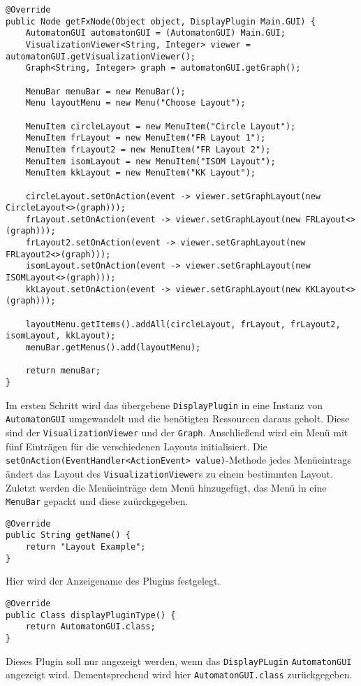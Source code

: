 \begin{lstlisting}[frame=single, basicstyle=\small, caption=Die Methode \textit{getFxNode}]
@Override
public Node getFxNode(Object object, DisplayPlugin Main.GUI) {
	AutomatonGUI automatonGUI = (AutomatonGUI) Main.GUI;
	VisualizationViewer<String, Integer> viewer = automatonGUI.getVisualizationViewer();
	Graph<String, Integer> graph = automatonGUI.getGraph();
	
	MenuBar menuBar = new MenuBar();
	Menu layoutMenu = new Menu("Choose Layout");
	
	MenuItem circleLayout = new MenuItem("Circle Layout");
	MenuItem frLayout = new MenuItem("FR Layout 1");
	MenuItem frLayout2 = new MenuItem("FR Layout 2");
	MenuItem isomLayout = new MenuItem("ISOM Layout");
	MenuItem kkLayout = new MenuItem("KK Layout");
	
	circleLayout.setOnAction(event -> viewer.setGraphLayout(new CircleLayout<>(graph)));
	frLayout.setOnAction(event -> viewer.setGraphLayout(new FRLayout<>(graph)));
	frLayout2.setOnAction(event -> viewer.setGraphLayout(new FRLayout2<>(graph)));
	isomLayout.setOnAction(event -> viewer.setGraphLayout(new ISOMLayout<>(graph)));
	kkLayout.setOnAction(event -> viewer.setGraphLayout(new KKLayout<>(graph)));
	
	layoutMenu.getItems().addAll(circleLayout, frLayout, frLayout2, isomLayout, kkLayout);
	menuBar.getMenus().add(layoutMenu);
	
	return menuBar;
}
\end{lstlisting}
Im ersten Schritt wird das übergebene \lstinline[columns=fixed]{DisplayPlugin} in eine Instanz von \lstinline[columns=fixed]{AutomatonGUI} umgewandelt und die benötigten Ressourcen daraus geholt. Diese sind der \lstinline[columns=fixed]{VisualizationViewer} und der \lstinline[columns=fixed]{Graph}. Anschließend wird ein Menü mit fünf Einträgen für die verschiedenen Layouts initialisiert. Die \lstinline[columns=fixed]{setOnAction(EventHandler<ActionEvent> value)}-Methode jedes Menüeintrags ändert das Layout des \lstinline[columns=fixed]{VisualizationViewer}s zu einem bestimmten Layout. Zuletzt werden die Menüeinträge dem Menü hinzugefügt, das Menü in eine \lstinline[columns=fixed]{MenuBar} gepackt und diese zuürckgegeben.
\begin{lstlisting}[frame=single, basicstyle=\small, caption=Die Methode \textit{getName}]
@Override
public String getName() {
	return "Layout Example";
}
\end{lstlisting}
Hier wird der Anzeigename des Plugins festgelegt.
\begin{lstlisting}[frame=single, basicstyle=\small, caption=Die Methode \textit{displayPluginType}]
@Override
public Class displayPluginType() {
	return AutomatonGUI.class;
}
\end{lstlisting}
Dieses Plugin soll nur angezeigt werden, wenn das \lstinline[columns=fixed]{DisplayPLugin} \lstinline[columns=fixed]{AutomatonGUI} angezeigt wird. Dementsprechend wird hier \lstinline[columns=fixed]{AutomatonGUI.class} zurückgegeben.

